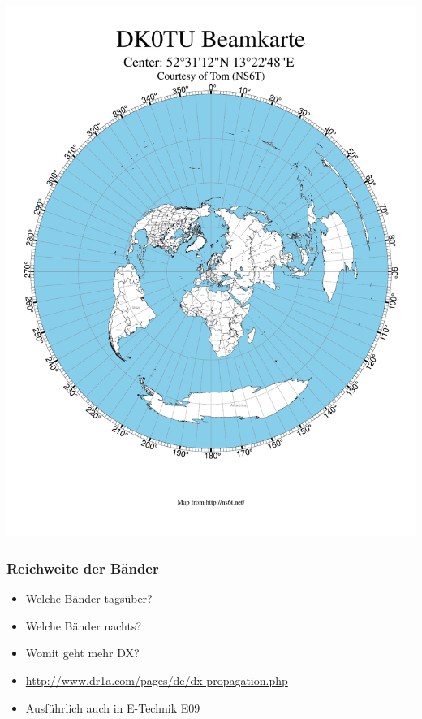 \begin{frame}
        \begin{center}
        \includegraphics[height=\textheight,height=\textheight,keepaspectratio]{a08/AzimuthalMap.pdf}
    \end{center}
\end{frame}

\begin{frame}
    \frametitle{Reichweite der Bänder}
    \begin{center}
    \begin{itemize}
    			\item Welche Bänder tagsüber?
    			\item Welche Bänder nachts?
    			\item Womit geht mehr DX?
    			\item \url{http://www.dr1a.com/pages/de/dx-propagation.php}
    			\item Ausführlich auch in E-Technik E09
    \end{itemize}
    \end{center}
\end{frame}

